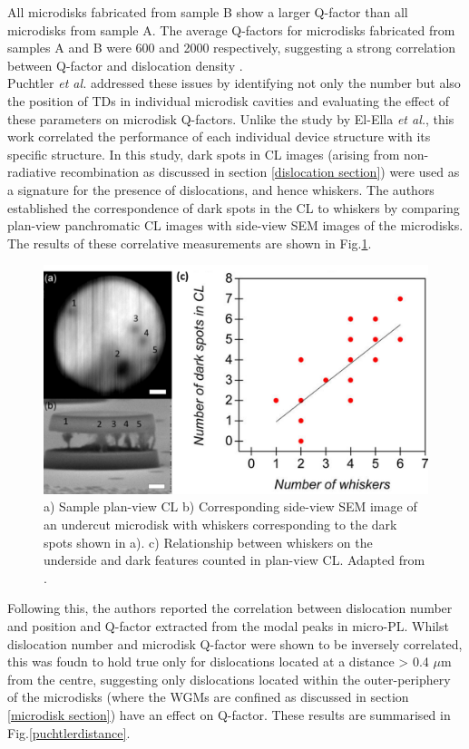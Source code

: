 All microdisks fabricated from sample B show a larger Q-factor than all microdisks from sample A. The average Q-factors for microdisks fabricated from samples A and B were 600 and 2000 respectively, suggesting a strong correlation between Q-factor and dislocation density \cite{El-Ella2011}.\\
Puchtler \textit{et al.} addressed these issues by identifying not only the number but also the position of TDs in individual microdisk cavities and evaluating the effect of these parameters on microdisk Q-factors\cite{Puchtler2015}.  Unlike the study by El-Ella \textit{et al.}, this work correlated the performance of each individual device structure with its specific structure. In this study, dark spots in CL images (arising from non-radiative recombination as discussed in section \ref{dislocation section}) were used as a signature for the presence of dislocations, and hence whiskers.  The authors established the correspondence of dark spots in the CL to whiskers by comparing plan-view panchromatic CL images with side-view SEM images of the microdisks. The results of these correlative measurements are shown in Fig.\ref{puchtlerdislocation}.

\begin{figure}[h]
	\centering
	\includegraphics[width=1\textwidth]{Figs/Ch4/puchtlerdislocation.png}
	\caption {a) Sample plan-view CL b) Corresponding side-view SEM image of an undercut microdisk with whiskers corresponding to the dark spots shown in a). c) Relationship between whiskers on the underside and dark features counted in plan-view CL. Adapted from \cite{Puchtler2015}.}
	\label{puchtlerdislocation}
\end{figure}
\FloatBarrier 

Following this, the authors reported the correlation between dislocation number and position and Q-factor extracted from the modal peaks in micro-PL. Whilst dislocation number and microdisk Q-factor were shown to be inversely correlated, this was foudn to hold true only for dislocations located at a distance > 0.4 $\mu$m from the centre, suggesting only dislocations located within the outer-periphery of the microdisks (where the WGMs are confined as discussed in section \ref{microdisk section}) have an effect on Q-factor. These results are summarised in Fig.\ref{puchtlerdistance}.

